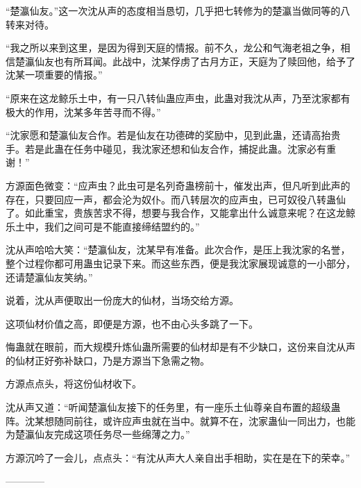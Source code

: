 \begin{this_body}
“楚瀛仙友。”这一次沈从声的态度相当恳切，几乎把七转修为的楚瀛当做同等的八转来对待。

“我之所以来到这里，是因为得到天庭的情报。前不久，龙公和气海老祖之争，相信楚瀛仙友也有所耳闻。此战中，沈某俘虏了古月方正，天庭为了赎回他，给予了沈某一项重要的情报。”

“原来在这龙鲸乐土中，有一只八转仙蛊应声虫，此蛊对我沈从声，乃至沈家都有极大的作用，沈某多年苦寻而不得。”

“沈家愿和楚瀛仙友合作。若是仙友在功德碑的奖励中，见到此蛊，还请高抬贵手。若是此蛊在任务中碰见，我沈家还想和仙友合作，捕捉此蛊。沈家必有重谢！”

方源面色微变：“应声虫？此虫可是名列奇蛊榜前十，催发出声，但凡听到此声的存在，只要回应一声，都会沦为奴仆。而八转层次的应声虫，已可奴役八转蛊仙了。如此重宝，贵族苦求不得，想要与我合作，又能拿出什么诚意来呢？在这龙鲸乐土中，我们之间可是不能直接缔结盟约的。”

沈从声哈哈大笑：“楚瀛仙友，沈某早有准备。此次合作，是压上我沈家的名誉，整个过程你都可用蛊虫记录下来。而这些东西，便是我沈家展现诚意的一小部分，还请楚瀛仙友笑纳。”

说着，沈从声便取出一份庞大的仙材，当场交给方源。

这项仙材价值之高，即便是方源，也不由心头多跳了一下。

悔蛊就在眼前，而大规模升炼仙蛊所需要的仙材却是有不少缺口，这份来自沈从声的仙材正好弥补缺口，乃是方源当下急需之物。

方源点点头，将这份仙材收下。

沈从声又道：“听闻楚瀛仙友接下的任务里，有一座乐土仙尊亲自布置的超级蛊阵。沈某想随同前往，或许应声虫就在当中。就算不在，沈家蛊仙一同出力，也能为楚瀛仙友完成这项任务尽一些绵薄之力。”

方源沉吟了一会儿，点点头：“有沈从声大人亲自出手相助，实在是在下的荣幸。”

------------

\end{this_body}

